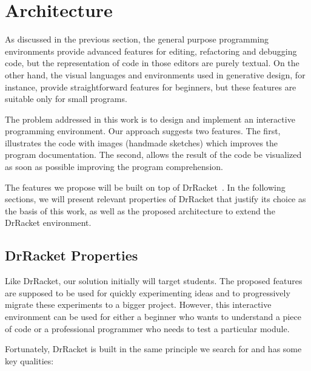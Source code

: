 
% 
% 

\section{Architecture}
\label{sec:arch}

As discussed in the previous section, the general purpose programming environments provide advanced features for editing, refactoring and debugging code, but the representation of code in those editors are purely textual. On the other hand, the visual languages and environments used in generative design, for instance, provide straightforward features for beginners, but these features are suitable only for small programs.

The problem addressed in this work is to design and implement an interactive programming environment. Our approach suggests two features. The first, illustrates the code with images (handmade sketches) which improves the program documentation. The second, allows the result of the code be visualized as soon as possible improving the program comprehension.

The features we propose will be built on top of DrRacket~\cite{findler2002drscheme}. In the following sections, we will present relevant properties of DrRacket that justify its choice as the basis of this work, as well as the proposed architecture to extend the DrRacket environment.

\subsection{DrRacket Properties}

Like DrRacket, our solution initially will target students. The proposed features are supposed to be used for quickly experimenting ideas and to progressively migrate these experiments to a bigger project. However, this interactive environment can be used for either a beginner who wants to understand a piece of code or a professional programmer who needs to test a particular module.

Fortunately, DrRacket is built in the same principle we search for and has some key qualities:

